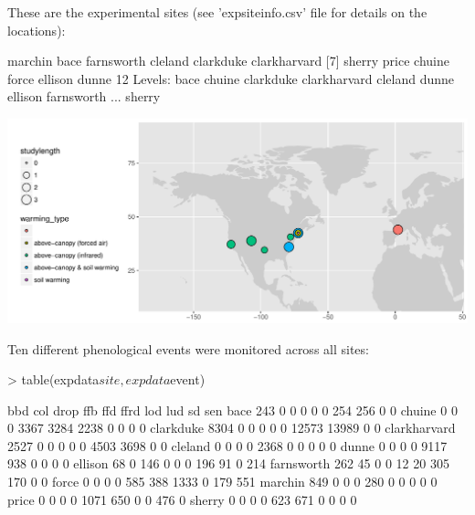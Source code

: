 \documentclass{article}
\begin{document}
These are the experimental sites (see 'expsiteinfo.csv' file for details on the locations):

\begin{Schunk}
\begin{Soutput}
 [1] marchin      bace         farnsworth   cleland      clarkduke    clarkharvard
 [7] sherry       price        chuine       force        ellison      dunne       
12 Levels: bace chuine clarkduke clarkharvard cleland dunne ellison farnsworth ... sherry
\end{Soutput}
\end{Schunk}
\includegraphics{maps/expsites.pdf}

Ten different phenological events were monitored across all sites:
\begin{Schunk}
\begin{Sinput}
> table(expdata$site, expdata$event)
\end{Sinput}
\begin{Soutput}
                 bbd   col  drop   ffb   ffd  ffrd   lod   lud    sd   sen
  bace           243     0     0     0     0     0   254   256     0     0
  chuine           0     0     0  3367  3284  2238     0     0     0     0
  clarkduke     8304     0     0     0     0     0 12573 13989     0     0
  clarkharvard  2527     0     0     0     0     0  4503  3698     0     0
  cleland          0     0     0     0  2368     0     0     0     0     0
  dunne            0     0     0     0  9117   938     0     0     0     0
  ellison         68     0   146     0     0     0   196    91     0   214
  farnsworth     262    45     0     0    12    20   305   170     0     0
  force            0     0     0     0   585   388  1333     0   179   551
  marchin        849     0     0     0   280     0     0     0     0     0
  price            0     0     0     0  1071   650     0     0   476     0
  sherry           0     0     0     0   623   671     0     0     0     0
\end{Soutput}
\end{Schunk}
\end{document}
